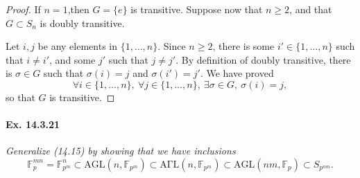 \documentclass[11pt,a4paper]{article}
\newcommand{\F}{\mathbb{F}}
\begin{document}
  \begin{proof}
  If $n= 1$,then $G = \{e\}$ is transitive. Suppose now that $n\geq 2$, and that $G \subset S_n$ is doubly transitive.
  
   Let $i,j$ be any elements in $\{1,\ldots,n\}$. Since $n\geq 2$, there is some $i' \in \{1,\ldots,n\}$ such that $i\ne i'$, and some $j'$ such that $j \ne j'$. By definition of doubly transitive, there is $\sigma \in G$ such that $\sigma(i) =j$ and $\sigma(i') = j'$. We have proved
   $$\forall i \in\{1,\ldots,n\},\ \forall j \in \{1,\ldots,n\},\ \exists \sigma \in G,\ \sigma(i) = j,$$
   so that $G$ is transitive.
  \end{proof}
  
   
  \paragraph{Ex. 14.3.21}{\it Generalize (14.15) by showing that we have inclusions
  $$\F_p^{mn} = \F_{p^m}^n \subset \mathrm{AGL}(n,\F_{p^m}) \subset \mathrm{A\Gamma L}(n,\F_{p^m}) \subset \mathrm{AGL}(nm,\F_p)\subset S_{p^{nm}}.$$
  }
\end{document}
